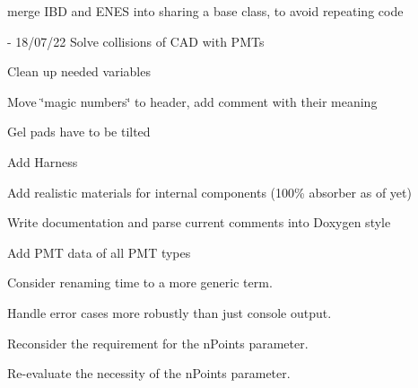 \begin{DoxyRefList}
merge IBD and ENES into sharing a base class, to avoid repeating code  
\item[File \mbox{\hyperlink{_o_m_sim_l_o_m18_8cc}{OMSim\+LOM18.cc}} ]\label{todo__todo000006}%
%
-\/ 18/07/22 Solve collisions of CAD with PMTs
\begin{DoxyItemize}
\item Clean up needed variables
\item Move \char`\"{}magic numbers\char`\"{} to header, add comment with their meaning
\item Gel pads have to be tilted
\item Add Harness
\item Add realistic materials for internal components (100\% absorber as of yet)
\item Write documentation and parse current comments into Doxygen style  
\end{DoxyItemize}
\item[Member \mbox{\hyperlink{class_o_m_sim_p_m_t_response_a0dd544847ff216a24aa8c528e76c9aed}{OMSim\+PMTResponse\+::create\+Histogram\+From\+Data}} (const std\+::string \&p\+File\+Path, const char $\ast$p\+TH2\+DName)]\label{todo__todo000002}%
%
Add PMT data of all PMT types  
\item[Member \mbox{\hyperlink{class_o_m_sim_s_n_tools_aa760cb3204e636696ce5be962409694e}{OMSim\+SNTools\+::findtime}} (G4double time, std\+::vector$<$ G4double $>$ timearray)]\label{todo__todo000013}%
%
Consider renaming \textquotesingle{}time\textquotesingle{} to a more generic term.  
\item[Member \mbox{\hyperlink{class_o_m_sim_s_n_tools_a89a22f20d0aff91704cf6cab1b48d266}{OMSim\+SNTools\+::get\+File\+Names}} (int value)]\label{todo__todo000011}%
%
Handle error cases more robustly than just console output.  
\item[Member \mbox{\hyperlink{class_o_m_sim_s_n_tools_acd2197f87f712d54eff8e93b233e8478}{OMSim\+SNTools\+::Inverse\+Cumul}} (std\+::vector$<$ G4double $>$ xvals, std\+::vector$<$ G4double $>$ yvals, G4int n\+Points)]\label{todo__todo000012}%
%
Reconsider the requirement for the \textquotesingle{}n\+Points\textquotesingle{} parameter.  
\item[Member \mbox{\hyperlink{class_o_m_sim_s_n_tools_a296fba8cceca9892ab52ac9e18064b01}{OMSim\+SNTools\+::Inverse\+Cumul\+Algorithm}} (std\+::vector$<$ G4double $>$ x, std\+::vector$<$ G4double $>$ f, std\+::vector$<$ G4double $>$ a, std\+::vector$<$ G4double $>$ Fc, G4int n\+Points)]\label{todo__todo000014}%
%
Re-\/evaluate the necessity of the \textquotesingle{}n\+Points\textquotesingle{} parameter. 
\end{DoxyRefList}